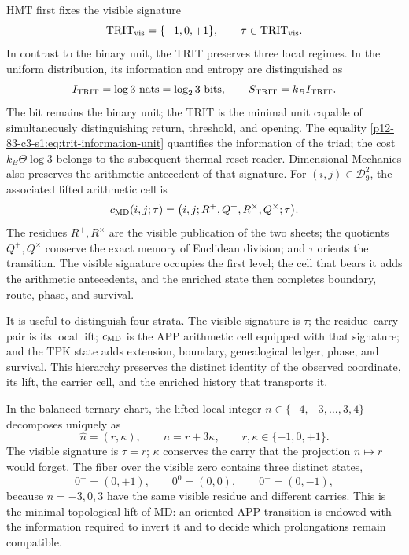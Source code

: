 HMT first fixes the visible signature
\begin{equation}
\mathrm{TRIT}_{\rm vis}=\{-1,0,+1\},
\qquad \tau\in\mathrm{TRIT}_{\rm vis}.
\label{p12-83-c3-s1:eq:trit-visible-signature}
\end{equation}
In contrast to the binary unit, the TRIT preserves three local regimes. In
the uniform distribution, its information and entropy are distinguished as
\begin{equation}
I_{\rm TRIT}=\log3\ \text{nats}=\log_2 3\ \text{bits},
\qquad S_{\rm TRIT}=k_BI_{\rm TRIT}.
\label{p12-83-c3-s1:eq:trit-information-unit}
\end{equation}
The bit remains the binary unit; the TRIT is the minimal unit capable of simultaneously distinguishing return, threshold, and opening. The equality \eqref{p12-83-c3-s1:eq:trit-information-unit} quantifies the information of the triad; the cost \(k_B\Theta\log3\) belongs to the subsequent thermal reset reader. Dimensional Mechanics also preserves the arithmetic antecedent of that signature. For \((i,j)\in\mathcal D_9^2\), the associated lifted arithmetic cell is
\begin{equation}
c_{\rm MD}(i,j;\tau)=
\bigl(i,j;R^+,Q^+,R^\times,Q^\times;\tau\bigr).
\label{p12-83-c3-s1:eq:trit-complete-local-unit}
\end{equation}
The residues \(R^+,R^\times\) are the visible publication of the two sheets;
the quotients \(Q^+,Q^\times\) conserve the exact memory of Euclidean
division; and \(\tau\) orients the transition. The visible signature occupies the first
level; the cell that bears it adds the arithmetic antecedents, and the
enriched state then completes boundary, route, phase, and survival.

It is useful to distinguish four strata. The visible signature is \(\tau\); the
residue--carry pair is its local lift; \(c_{\rm MD}\) is the APP
arithmetic cell equipped with that signature; and the TPK state adds extension,
boundary, genealogical ledger, phase, and survival. This hierarchy preserves the distinct
identity of the observed coordinate, its lift, the carrier cell, and the
enriched history that transports it.

In the balanced ternary chart, the lifted local integer
\(n\in\{-4,-3,\ldots,3,4\}\) decomposes uniquely as
\begin{equation}
\widehat n=(r,\kappa),
\qquad n=r+3\kappa,
\qquad r,\kappa\in\{-1,0,+1\}.
\label{p12-83-c3-s1:eq:trit-balanced-lift}
\end{equation}
The visible signature is \(\tau=r\); \(\kappa\) conserves the carry that the projection
\(n\mapsto r\) would forget.
The fiber over the visible zero contains three distinct states,
\[
0^+=(0,+1),\qquad 0^0=(0,0),\qquad 0^-=(0,-1),
\]
because \(n=-3,0,3\) have the same visible residue and different carries. This
is the minimal topological lift of MD: an oriented APP transition
is endowed with the information required to invert it and to decide which
prolongations remain compatible.


